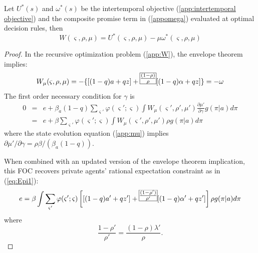 \documentclass[12pt,letter,leqno]{article}
\theoremstyle{asn}
\theoremstyle{lem}
\theoremstyle{slem}
\theoremstyle{prop}
\theoremstyle{appprop}
\theoremstyle{rem}
\theoremstyle{defn}
\begin{document}
\begin{slem}\label{lem:WandU}
Let $U^*(s)$ and $\omega^*(s)$ be the intertemporal objective (\ref{app:intertemporal objective}) and the composite promise term in (\ref{appomega}) evaluated at optimal decision rules, then
\begin{equation}\label{eq:WandU}
W\left(\varsigma,\rho ,\mu \right) =U^*\left(\varsigma,\rho ,\mu \right)
-\mu \omega^{\ast }\left(\varsigma,\rho ,\mu \right)
\end{equation}%
\end{slem}
\begin{proof}
In the recursive optimization problem (\ref{app:W}), the envelope theorem implies: 
\begin{equation*}
W_\mu(\varsigma,\rho,\mu)=-\{[(1-q)a+qz]+\frame{$\frac{(1-\rho)}{\rho
}$}[(1-q)\alpha+qz]\}=-\omega
\end{equation*}
The first order necessary condition for $\gamma$ is 
\begin{eqnarray*}
0 &=&e+\beta_{a}(1-q)\sum_{\varsigma '}\varphi (\varsigma
';\varsigma)\int W_{\mu }(\varsigma ',\rho ',\mu
')\frac{\partial \mu '}{\partial \gamma}g(\pi |a)d\pi \\
&=&e+\beta \sum_{\varsigma '}\varphi (\varsigma ';\varsigma
)\int W_{\mu }(\varsigma ',\rho ',\mu
')\rho g(\pi|a)d\pi
\end{eqnarray*}
where the state evolution equation (\ref{app:mu}) implies $\partial \mu '/\partial \gamma=\rho \beta/(\beta_a(1-q))$.

When combined with an updated version of the envelope theorem implication, this FOC recovers private agents' rational expectation constraint as in (\ref{eq:Epi1}):%
\begin{equation*} 
e=\beta \int \sum_{\varsigma '}\varphi (\varsigma ';\varsigma
)\left[ [(1-q)a'+qz']+\frame{$\frac{(1-\rho ')}{%
\rho '}$}[(1-q)\alpha '+qz']\right] \rho g(\pi|a)d\pi
\end{equation*}%
where%
\begin{equation*} 
\frac{1-\rho '}{\rho '}=\frac{\left( 1-\rho\right)
\lambda '}{\rho}.
\end{equation*}


\end{proof}
\end{document}

